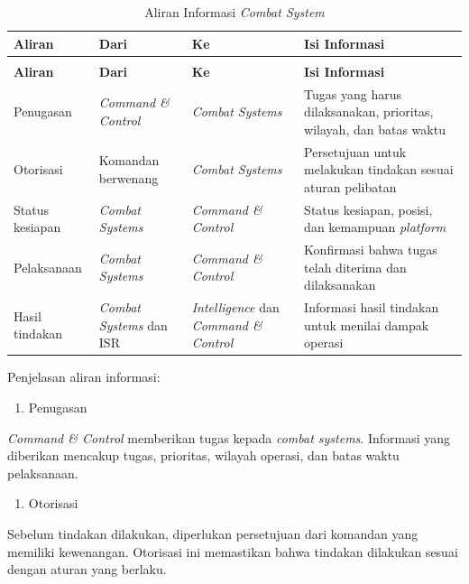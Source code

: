 {\small
\begin{longtable}{@{}>{\raggedright\arraybackslash}p{}>{\raggedright\arraybackslash}p{}>{\raggedright\arraybackslash}p{}>{\raggedright\arraybackslash}p{}@{}}
\caption{Aliran Informasi \textit{Combat System}}
\label{tab:d4-33}\\
\toprule
\textbf{Aliran} & \textbf{Dari} & \textbf{Ke} & \textbf{Isi Informasi}\\
\midrule
\endfirsthead
\multicolumn{4}{@{}l}{\small\itshape \tablename\ \thetable{} (lanjutan)}\\
\toprule
\textbf{Aliran} & \textbf{Dari} & \textbf{Ke} & \textbf{Isi Informasi}\\
\midrule
\endhead
\bottomrule
\endlastfoot
Penugasan & \textit{Command \& Control} & \textit{Combat Systems} & Tugas yang harus dilaksanakan, prioritas, wilayah, dan batas waktu\\
Otorisasi & Komandan berwenang & \textit{Combat Systems} & Persetujuan untuk melakukan tindakan sesuai aturan pelibatan\\
Status kesiapan & \textit{Combat Systems} & \textit{Command \& Control} & Status kesiapan, posisi, dan kemampuan \textit{platform}\\
Pelaksanaan & \textit{Combat Systems} & \textit{Command \& Control} & Konfirmasi bahwa tugas telah diterima dan dilaksanakan\\
Hasil tindakan & \textit{Combat Systems} dan ISR & \textit{Intelligence} dan \textit{Command \& Control} & Informasi hasil tindakan untuk menilai dampak operasi\\
\end{longtable}
}

Penjelasan aliran informasi:

\begin{enumerate}
  \item Penugasan
\end{enumerate}
\textit{Command \& Control} memberikan tugas kepada \textit{combat systems}. Informasi yang diberikan mencakup tugas, prioritas, wilayah operasi, dan batas waktu pelaksanaan.

\begin{enumerate}[start=2]
  \item Otorisasi
\end{enumerate}
Sebelum tindakan dilakukan, diperlukan persetujuan dari komandan yang memiliki kewenangan. Otorisasi ini memastikan bahwa tindakan dilakukan sesuai dengan aturan yang berlaku.

